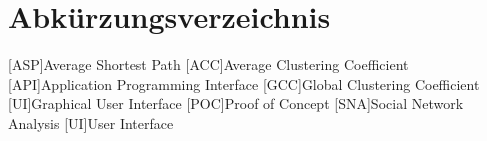 \chapter*{Abkürzungsverzeichnis}
\begin{acronym}
    [ASP]{Average Shortest Path}
    [ACC]{Average Clustering Coefficient}
    [API]{Application Programming Interface}
    [GCC]{Global Clustering Coefficient}
    [UI]{Graphical User Interface}
    [POC]{Proof of Concept}
    [SNA]{Social Network Analysis}
    [UI]{User Interface}
\end{acronym}
